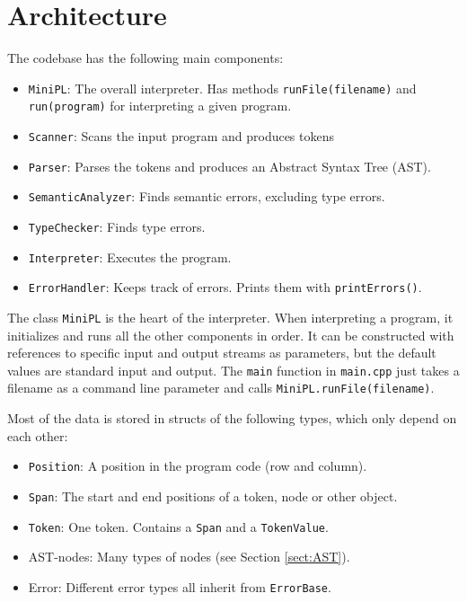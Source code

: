 \documentclass[a4paper]{article}
\newcommand*{\code}[1]{\texttt{#1}}
\begin{document}
\clearpage
\section{Architecture}


The codebase has the following main components:

\begin{itemize}
  \item \code{MiniPL}: The overall interpreter. Has methods 
        \code{runFile(filename)} and \code{run(program)} for 
        interpreting a given program.
  \item \code{Scanner}:  
        Scans the input program and produces tokens
  \item \code{Parser}:
        Parses the tokens and produces an Abstract Syntax Tree (AST).
  \item \code{SemanticAnalyzer}: Finds semantic
        errors, excluding type errors.
  \item \code{TypeChecker}: Finds type errors.
  \item \code{Interpreter}: Executes the program.
  \item \code{ErrorHandler}: Keeps track of errors. Prints them with
  \code{printErrors()}.
\end{itemize}
The class \code{MiniPL} is the heart of the interpreter. When 
interpreting a program, it initializes 
and runs all the other components in order. It can be constructed 
with references to specific input and output streams as parameters, 
but the default values are standard input and output. 
The \code{main} function in \code{main.cpp} just takes a 
filename as a command line parameter and calls 
\code{MiniPL.runFile(filename)}. 

Most of the data is stored in structs of the following types, 
which only depend on each other:
\begin{itemize}
  \item \code{Position}: A position in the program code (row and column).
  \item \code{Span}: The start and end positions of a token, node or other object.
  \item \code{Token}: One token. Contains a \code{Span} and 
  a \code{TokenValue}.
  \item AST-nodes: Many types of nodes 
        (see Section \ref{sect:AST}).
  \item Error: Different 
  error types all inherit from \code{ErrorBase}.
\end{itemize}
\end{document}
